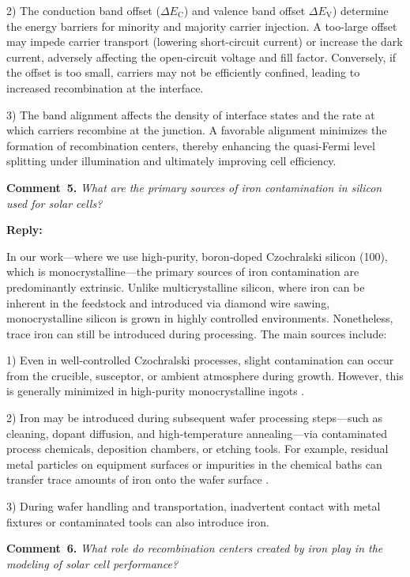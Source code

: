 \documentclass[a4paper,fleqn]{cas-sc}
\begin{document}
2) The conduction band offset ($\Delta E_\mathrm{C}$) and valence band offset $\Delta E_\mathrm{V}$) determine the energy barriers for minority and majority carrier injection. A too-large offset may impede carrier transport (lowering short-circuit current) or increase the dark current, adversely affecting the open-circuit voltage and fill factor. Conversely, if the offset is too small, carriers may not be efficiently confined, leading to increased recombination at the interface.

3) The band alignment affects the density of interface states and the rate at which carriers recombine at the junction. A favorable alignment minimizes the formation of recombination centers, thereby enhancing the quasi-Fermi level splitting under illumination and ultimately improving cell efficiency.


\noindent
\textcolor[rgb]{0.00,0.50,1.00}{\textbf{Comment~5.}}
\emph{What are the primary sources of iron contamination in silicon used for solar cells?}

\noindent
\textcolor[rgb]{0.51,0.00,0.00}{\textbf{Reply:}}

In our work—where we use high‑purity, boron‑doped Czochralski silicon (100), which is monocrystalline—the primary sources of iron contamination are predominantly extrinsic. Unlike multicrystalline silicon, where iron can be inherent in the feedstock and introduced via diamond wire sawing, monocrystalline silicon is grown in highly controlled environments. Nonetheless, trace iron can still be introduced during processing. The main sources include:

1) Even in well‐controlled Czochralski processes, slight contamination can occur from the crucible, susceptor, or ambient atmosphere during growth. However, this is generally minimized in high‑purity monocrystalline ingots \cite{Goncalo2017}.

2) Iron may be introduced during subsequent wafer processing steps—such as cleaning, dopant diffusion, and high‑temperature annealing—via contaminated process chemicals, deposition chambers, or etching tools. For example, residual metal particles on equipment surfaces or impurities in the chemical baths can transfer trace amounts of iron onto the wafer surface \cite{abbott2014}.

3) During wafer handling and transportation, inadvertent contact with metal fixtures or contaminated tools can also introduce iron.


\noindent
\textcolor[rgb]{0.00,0.50,1.00}{\textbf{Comment~6.}}
\emph{What role do recombination centers created by iron play in the modeling of solar cell performance?}
\end{document}
